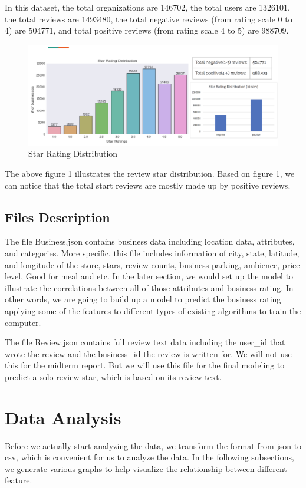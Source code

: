 \documentclass{article}
\begin{document}
In this dataset, the total organizations are 146702, the total users are 1326101, the total reviews are 1493480, the total negative reviews (from rating scale 0 to 4) are 504771, and total positive reviews (from rating scale 4 to 5) are 988709. 

\begin{figure}[!ht]
\centering
\includegraphics[width=\textwidth]{ReviewDistribution.png}
\caption{Star Rating Distribution}
\end{figure}

The above figure 1 illustrates the review star distribution. Based on figure 1, we can notice that the total start reviews are mostly made up by positive reviews.

\subsection{Files Description}

The file Business.json contains business data including location data, attributes, and categories. More specific, this file includes information of city, state, latitude, and longitude of the store, stars, review counts, business parking, ambience, price level, Good for meal and etc. In the later section, we would set up the model to illustrate the correlations between all of those attributes and business rating. In other words, we are going to build up a model to predict the business rating applying some of the features to different types of existing algorithms to train the computer.

The file Review.json contains full review text data including the user\_id that wrote the review and the business\_id the review is written for. We will not use this for the midterm report. But we will use this file for the final modeling to predict a solo review star, which is based on its review text.

\section{Data Analysis}
Before we actually start analyzing the data, we transform the format from json to csv, which is convenient for us to analyze the data. In the following subsections, we generate various graphs to help visualize the relationship between different feature.
\end{document}
